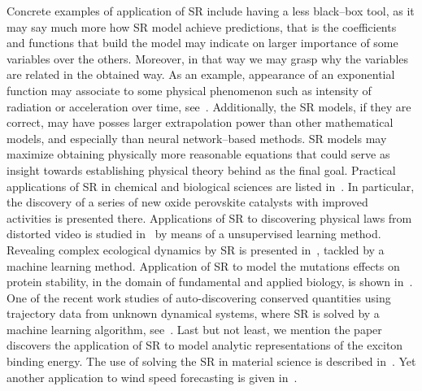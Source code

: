 \documentclass[a4paper,12pt]{elsarticle}
\begin{document}
	
	 Concrete examples of application of SR include having a less black--box tool, as it may say much more how SR model achieve predictions, that is the coefficients and functions that build the model may indicate on larger importance of some variables over the others. Moreover, in that way we may grasp why the variables are related in the obtained way. As an example, appearance of an exponential function may associate  to  some physical phenomenon such as intensity of radiation or acceleration over time, see~\cite{udrescu2020ai}. Additionally, the SR models, if they are correct, may have    posses  larger extrapolation power than other mathematical models, and especially than neural network--based methods. SR models may maximize obtaining physically more reasonable equations that could serve as insight towards  establishing  physical theory behind as the final goal.  Practical applications of SR in chemical and biological sciences are listed in~\cite{weng2020simple}. In particular,  the discovery of a series of new oxide perovskite catalysts with improved activities is presented there. Applications of SR to discovering physical laws from distorted video is studied in~\cite{udrescu2021symbolic} by means of a unsupervised learning method. Revealing complex ecological dynamics by SR is presented in~\cite{chen2019revealing}, tackled by  a machine learning method. Application of SR to model the mutations effects on protein  stability, in the domain of fundamental and applied biology,  is shown in~\cite{louis2021reviewing}. One of the recent work studies of  auto-discovering conserved quantities using trajectory data from unknown dynamical systems, where SR is solved by a machine learning algorithm, see~\cite{liu2021machine}. Last but not least, we mention the paper~\cite{liang2019phillips} discovers  the application of  SR to model analytic representations of the exciton binding energy. The use of solving the SR in material science is described in~\cite{wang2019symbolic,wang2022symbolic,burlacu2022symbolic,kabliman2021application}. Yet another application to wind speed forecasting is given in~\cite{abdellaoui2021symbolic}. 
	 
	 
	 
\end{document}
